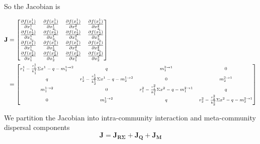 \documentclass[12pt]{article}
\begin{document}
So the Jacobian is 

\begin{align*}
\mathbf{J} &= \begin{bmatrix}
    \frac{\partial f(x_1^1)}{\partial x_1^1} & \frac{\partial f(x_1^1)}{\partial x_2^1} & \frac{\partial f(x_1^1)}{\partial x_1^2} & \frac{\partial f(x_1^1)}{\partial x_2^2}\\ 
        \frac{\partial f(x_2^1)}{\partial x_1^1} & \frac{\partial f(x_2^1)}{\partial x_2^1} & \frac{\partial f(x_2^1)}{\partial x_1^2} & \frac{\partial f(x_2^1)}{\partial x_2^2}\\ 
            \frac{\partial f(x_1^2)}{\partial x_1^1} & \frac{\partial f(x_1^2)}{\partial x_2^1} & \frac{\partial f(x_1^2)}{\partial x_1^2} & \frac{\partial f(x_1^2)}{\partial x_2^2}\\ 
                \frac{\partial f(x_2^2)}{\partial x_1^1} & \frac{\partial f(x_2^2)}{\partial x_2^1} & \frac{\partial f(x_2^2)}{\partial x_1^2} & \frac{\partial f(x_2^2)}{\partial x_2^2} \\    
\end{bmatrix} \\
 &= \scriptsize{\begin{bmatrix}
    r_1^1 - \frac{r_1^1}{k_1^1} \Sigma x^1 - q -  m_1^{1\rightarrow 2} &  
    	q & 
    		m_1^{2\rightarrow 1} & 
    			0 \\ 
    q & 
    	r_2^1 - \frac{r_2^1}{k_2^1}\Sigma x^1 - q - m_2^{1\rightarrow 2} & 
    		0 & 
    			m_2^{2\rightarrow 1} \\
    m_1^{1\rightarrow 2} & 
    	0 & 
    		r_1^2 - \frac{r_1^2}{k_1^2} \Sigma x^2 - q - m_1^{2\rightarrow 1}& 
    			q \\
    0 & 
    	m_2^{1\rightarrow 2} & 
    		q &
    			r_2^2 - \frac{r_2^2}{k_2^2} \Sigma x^2 - q - m_2^{2\rightarrow 1} \\       
\end{bmatrix} }
\end{align*}

We partition the Jacobian into intra-community interaction and meta-community dispersal components
\[ \mathbf{J} = \mathbf{J_{R\Sigma}} + \mathbf{J_Q} + \mathbf{J_M} \]
\end{document}
